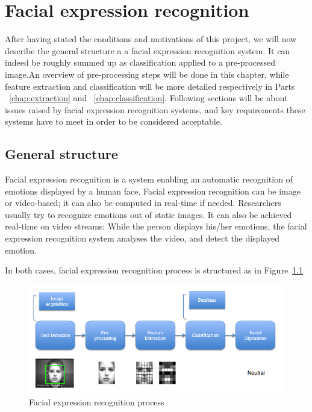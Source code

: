 \chapter{Facial expression recognition}

\noindent After having stated the conditions and motivations of this project, we will now describe the general structure a a facial expression recognition system. It can indeed be roughly summed up as classification applied to a pre-processed image.An overview of pre-processing steps will be done in this chapter, while feature extraction and classification will be more detailed respectively in Parts ~\ref{chap:extraction} and ~\ref{chap:classification}. Following sections will be about issues raised by facial expression recognition systems, and key requirements these systems have to meet in order to be considered acceptable.

\section{General structure}

\vspace{\baselineskip}
\noindent Facial expression recognition is a system enabling an automatic recognition of emotions displayed by a human face. Facial expression recognition can be image or video-based; it can also be computed in real-time if needed. Researchers usually try to recognize emotions out of static images. It can also be achieved real-time on video streams: While the person displays his/her emotions, the facial expression recognition system analyses the video, and detect the displayed emotion.
\newline

\noindent In both cases, facial expression recognition process is structured as in Figure~\ref{facial_expression_recognition_process}
\newline

\begin{figure}[!h]
\begin{center}
\noindent \includegraphics[scale=0.6]{figures/facial_expression_recognition_process} 
\newline
\caption{Facial expression recognition process}
\label{facial_expression_recognition_process}
\end{center} 
\end{figure}

